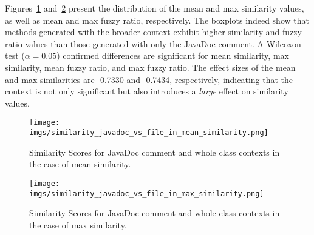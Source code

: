 Figures~\ref{fig:similarity_javadoc_vs_file_in_mean_similarity} and~\ref{fig:similarity_javadoc_vs_file_in_max_similarity} present the distribution of the mean and max similarity values, as well as mean and max fuzzy ratio, respectively. The boxplots indeed show that methods generated with the broader context exhibit higher similarity and fuzzy ratio values than those generated with only the JavaDoc comment. 
A Wilcoxon test ($\alpha = 0.05$) confirmed differences are significant for mean similarity, max similarity, mean fuzzy ratio, and max fuzzy ratio.  The effect sizes of the mean and max similarities are -0.7330 and -0.7434, respectively, indicating that the context is not only significant but also introduces a \emph{large} effect on similarity values. 

\begin{figure}[ht] \centering \texttt{[image: imgs/similarity\_javadoc\_vs\_file\_in\_mean\_similarity.png]} 
\vspace{-10pt} 

\caption{Similarity Scores for JavaDoc comment and whole class contexts in the case of mean similarity.} 
\vspace{-5pt} 

\label{fig:similarity_javadoc_vs_file_in_mean_similarity} \end{figure}


\begin{figure}[ht] \centering \texttt{[image: imgs/similarity\_javadoc\_vs\_file\_in\_max\_similarity.png]} 
\vspace{-10pt} 

\caption{Similarity Scores for JavaDoc comment and whole class contexts in the case of max similarity.} 

\label{fig:similarity_javadoc_vs_file_in_max_similarity} \end{figure}






